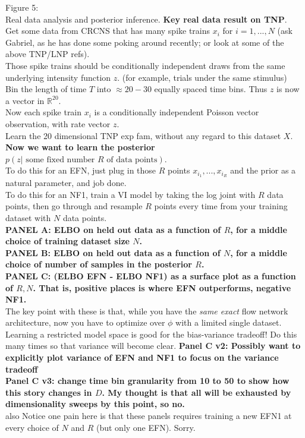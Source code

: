 \documentclass{article}
\begin{document}
Figure 5: \\
Real data analysis and posterior inference.  {\bf Key real data result on TNP}.  \\
Get some data from CRCNS that has many spike trains $x_i$ for $i=1,...,N$ (ask Gabriel, as he has done some poking around recently; or look at some of the above TNP/LNP refs). \\
Those spike trains should be conditionally independent draws from the same underlying intensity function $z$.  (for example, trials under the same stimulus)\\
Bin the length of time $T$ into $\approx 20-30$ equally spaced time bins.  Thus $z$ is now a vector in $\mathbb{R}^20$. \\
Now each spike train $x_i$ is a conditionally independent Poisson vector observation, with rate vector $z$.\\
Learn the 20 dimensional TNP exp fam, without any regard to this dataset $X$. \\
{\bf Now we want to learn the posterior $p(z | \textrm{ some fixed number $R$ of data points})$}.  \\
To do this for an EFN, just plug in those $R$ points $x_{i_1},...,x_{i_R}$ and the prior as a natural parameter, and job done. \\
To do this for an NF1, train a VI model by taking the log joint with $R$ data points, then go through and resample $R$ points every time from your training dataset with $N$ data points. \\
{\bf PANEL A: ELBO on held out data as a function of $R$, for a middle choice of training dataset size $N$.} \\ 
{\bf PANEL B: ELBO on held out data as a function of $N$, for a middle choice of number of samples in the posterior $R$.} \\
{\bf PANEL C: (ELBO EFN - ELBO NF1) as a surface plot as a function of $R,N$.  That is, positive places is where EFN outperforms, negative NF1.} \\  
The key point with these is that, while you have the \emph{same exact} flow network architecture, now you have to optimize over $\phi$ with a limited single dataset.  Learning a restricted model space is good for the bias-variance tradeoff!  Do this many times so that variance will become clear.  
{\bf Panel C v2: Possibly want to explicitly plot variance of EFN and NF1 to focus on the variance tradeoff}\\
{\bf Panel C v3: change time bin granularity from 10 to 50 to show how this story changes in $D$.  My thought is that all will be exhausted by dimensionality sweeps by this point, so no.}\\
 also Notice one pain here is that these panels requires training a new EFN1 at every choice of $N$ and $R$ (but only one EFN).  Sorry. \\
\end{document}
